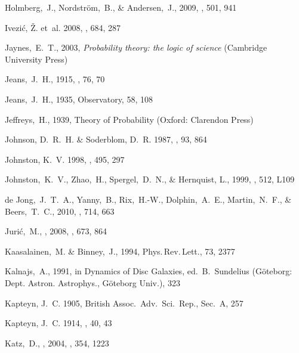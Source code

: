 \begin{thebibliography}{99}
  Holmberg,~J., Nordstr\"{o}m,~B., \& Andersen,~J., 2009,
  \aap, 501, 941

{Ivezi{\'c}}, {\v Z}. {et~al.} 2008, \apj, 684, 287

  Jaynes,~E.~T., 2003,
  \textit{Probability theory: the logic of science} (Cambridge University Press)

  Jeans,~J.~H., 1915,
  \mnras, 76, 70

  Jeans,~J.~H., 1935,
  Observatory, 58, 108

  Jeffreys,~H., 1939,
  Theory of Probability (Oxford: Clarendon Press)

{Johnson}, D.~R.~H. \& {Soderblom}, D.~R. 1987, \aj, 93, 864

{Johnston}, K.~V. 1998, \apj, 495, 297

  Johnston,~K.~V., Zhao,~H., Spergel,~D.~N., \& Hernquist, L., 1999,
  \apjl, 512, L109 

  de Jong,~J.~T.~A., Yanny,~B., Rix,~H.-W., Dolphin,~A.~E., Martin,~N.~F., \& Beers,~T.~C., 2010, \apj, 714, 663

  Juri\'{c},~M., \etal, 2008, \apj, 673, 864

  Kaasalainen,~M. \& Binney,~J., 1994,
  Phys.\,Rev.\,Lett., 73, 2377

  Kalnajs,~A., 1991, in Dynamics of Disc Galaxies, ed.~B.~Sundelius (G\"{o}teborg: Dept. Astron. Astrophys., G\"{o}teborg Univ.), 323

{Kapteyn}, J.~C. 1905, {British Assoc.~Adv.~Sci.~Rep.}, Sec.~A, 257

{Kapteyn}, J.~C. 1914, \apj, 40, 43

  Katz,~D., \etal, 2004,
\mnras, 354, 1223


\end{thebibliography}
